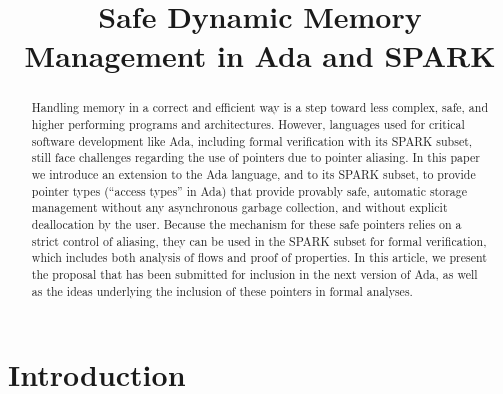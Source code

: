 \documentclass{llncs}
\begin{document}

\title{Safe Dynamic Memory Management in Ada and SPARK }

\maketitle
\begin{abstract}
Handling memory in a correct and efficient way is a step toward less complex, safe, and higher performing programs and architectures. However, languages used for critical software development like Ada, including formal verification with its SPARK subset, still face challenges regarding the use of pointers due to pointer aliasing. In this paper we introduce an extension to the Ada language, and to its SPARK subset, to provide pointer types (``access types'' in Ada) that provide provably safe, automatic storage management without any asynchronous garbage collection, and without explicit deallocation by the user. Because the mechanism for these safe pointers relies on a strict control of aliasing, they can be used in the SPARK subset for formal verification, which includes both analysis of flows and proof of properties. In this article, we present the proposal that has been submitted for inclusion in the next version of Ada, as well as the ideas underlying the inclusion of these pointers in formal analyses.
\end{abstract}



\keywords


\section{Introduction}
\end{document}
